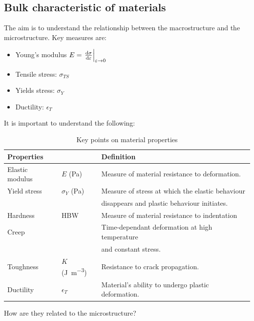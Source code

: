 \subsection{Bulk characteristic of materials}
The aim is to understand the relationship between the macrostructure and the microstructure. Key measures are:
\begin{itemize}
	\item Young's modulus $E = \left. \frac{\dif \sigma}{\dif \varepsilon} \right|_{\varepsilon \rightarrow 0}$
	\item Tensile stress: $\sigma_{TS}$
	\item Yields stress: $\sigma_{Y}$
	\item Ductility: $\epsilon_{T}$
\end{itemize}
It is important to understand the following:
\begin{table}
	\centering
	\begin{tabular}{@{}lll@{}}
		\toprule
		\textbf{Properties} &                                   & \textbf{Definition}                                \\
		\midrule
		Elastic modulus     & $E$ (\si{\pascal})                & Measure of material resistance to deformation.     \\
		Yield stress        & $\sigma_Y$ (\si{\pascal})         & Measure of stress at which the elastic behaviour   \\
		                    &                                   & disappears and plastic behaviour initiates.        \\
		Hardness            & HBW                               & Measure of material resistance to indentation      \\
		Creep               &                                   & Time-dependant deformation at high temperature     \\
		                    &                                   & and constant stress.                               \\
		Toughness           & $K$ (\si{\joule\per\meter\cubed}) & Resistance to crack propagation.                   \\
		Ductility           & $\epsilon_T$                      & Material's ability to undergo plastic deformation. \\
		\bottomrule
	\end{tabular}
	\caption{Key points on material properties}
\end{table}
How are they related to the microstructure?
